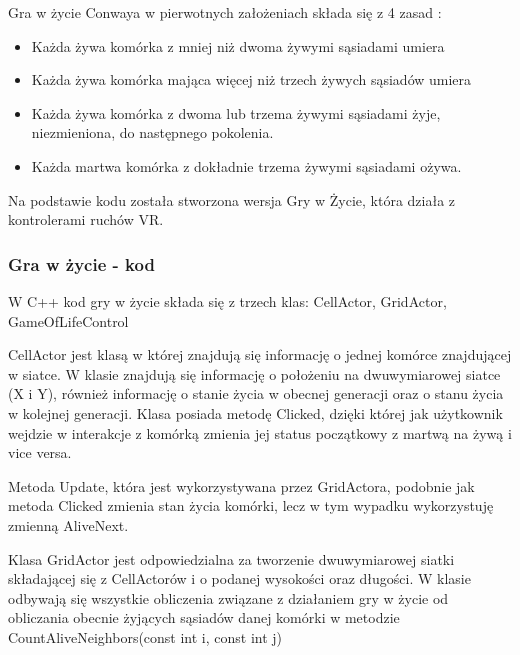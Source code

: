 \documentclass[a4paper,12pt,reqno]{article}
\begin{document}
Gra w życie Conwaya w pierwotnych założeniach składa się z 4 zasad \cite{game_of_life_story}:

\begin{itemize}
\item Każda żywa komórka z mniej niż dwoma żywymi sąsiadami umiera
\item Każda żywa komórka mająca więcej niż trzech żywych sąsiadów umiera
\item Każda żywa komórka z dwoma lub trzema żywymi sąsiadami żyje, niezmieniona, do następnego pokolenia.
\item Każda martwa komórka z dokładnie trzema żywymi sąsiadami ożywa.
\end{itemize}


Na podstawie kodu \cite{game_of_life_code} została stworzona wersja Gry w Życie, która działa z kontrolerami ruchów VR.
\subsubsection{Gra w życie - kod}

W C++ kod gry w życie składa się z trzech klas: CellActor, GridActor, GameOfLifeControl

CellActor jest klasą w której znajdują się informację o jednej komórce znajdującej w siatce. W klasie znajdują się informację o położeniu na dwuwymiarowej siatce (X i Y), również informację o stanie życia w obecnej generacji oraz o stanu życia w kolejnej generacji. Klasa posiada metodę Clicked, dzięki której jak użytkownik wejdzie w interakcje z komórką zmienia jej status początkowy z martwą na żywą i vice versa. 



Metoda Update, która jest wykorzystywana przez GridActora, podobnie jak metoda Clicked zmienia stan życia komórki, lecz w tym wypadku wykorzystuję zmienną AliveNext.




Klasa GridActor jest odpowiedzialna za tworzenie dwuwymiarowej siatki składającej się z CellActorów i o podanej wysokości oraz długości. W klasie odbywają się wszystkie obliczenia związane z działaniem gry w życie od obliczania obecnie żyjących sąsiadów danej komórki w metodzie CountAliveNeighbors(const int i, const int j)
\end{document}
